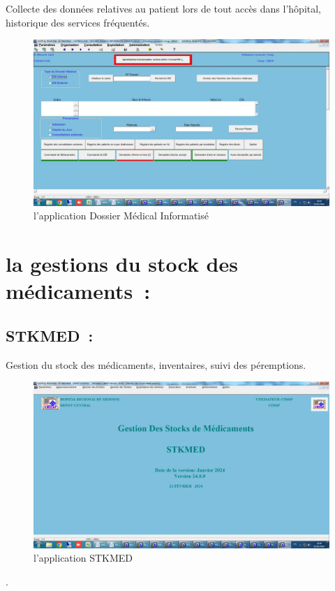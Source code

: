 \documentclass[12pt]{rapportINPTCLOUD}
\begin{document}
	Collecte des données relatives au patient lors de tout accès dans l'hôpital, historique des services fréquentés.
\begin{figure}[H]
	\centering
	\includegraphics[width=1\linewidth]{img/l.jpg}
	\caption{l'application Dossier Médical Informatisé}
	\label{fig:Dossier Médical Informatisé}
\end{figure}\newpage
	\section{\textcolor{sectioncolor}{la gestions du stock des médicaments :}}

\subsection{STKMED :} Gestion du stock des médicaments, inventaires, suivi des péremptions.
\begin{figure}[H]
	\centering
	\includegraphics[width=1\linewidth]{img/m.jpg}
	\caption{l'application STKMED}
	\label{fig:STKMED}
\end{figure}
 .\\ \\ \\
\end{document}
